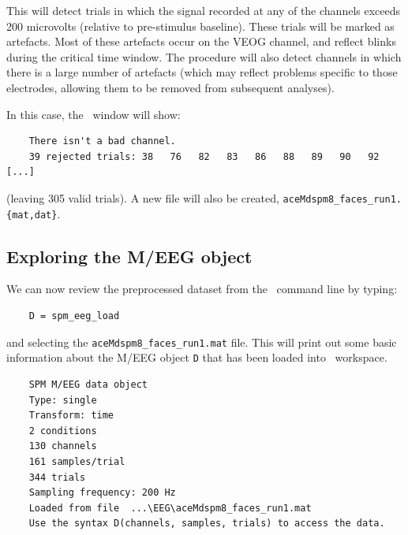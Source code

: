 This will detect trials in which the signal recorded at any of the channels exceeds 200 microvolts (relative to pre-stimulus baseline). These trials will be marked as artefacts. Most of these artefacts occur on the VEOG channel, and reflect blinks during the critical time window. The procedure will also detect channels in which there is a large number of artefacts (which may reflect problems specific to those electrodes, allowing them to be removed from subsequent analyses).

In this case, the \matlab\ window will show:
\begin{verbatim}
    There isn't a bad channel.
    39 rejected trials: 38   76   82   83   86   88   89   90   92   [...]
\end{verbatim}
(leaving 305 valid trials). A new file will also be created, \texttt{aceMdspm8\_faces\_run1.\{mat,dat\}}.

\subsection{Exploring the M/EEG object}

We can now review the preprocessed dataset from the \matlab\ command line by typing:
\begin{verbatim}
    D = spm_eeg_load
\end{verbatim}
and selecting the \texttt{aceMdspm8\_faces\_run1.mat} file. This will print out some basic information about the M/EEG object \texttt{D} that has been loaded into \matlab\ workspace.
\begin{verbatim}
    SPM M/EEG data object
    Type: single
    Transform: time
    2 conditions
    130 channels
    161 samples/trial
    344 trials
    Sampling frequency: 200 Hz
    Loaded from file  ...\EEG\aceMdspm8_faces_run1.mat
    Use the syntax D(channels, samples, trials) to access the data.
\end{verbatim}

